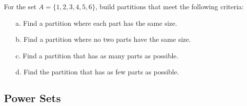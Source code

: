 \documentclass[a4paper,12pt]{book}
\newcounter{question}
\begin{document}
        \begin{questionNOGRADE}{\thequestion}

            For the set $A = \{1, 2, 3, 4, 5, 6\}$, build partitions that
            meet the following criteria:

            \begin{enumerate}
                \item[a.]   Find a partition where each part has the same size.

                \item[b.]   Find a partition where no two parts have the same size.

                \item[c.]   Find a partition that has as many parts as possible.

                \item[d.]   Find the partition that has as few parts as possible.
            \end{enumerate}

        \end{questionNOGRADE}

        \notonkey{ \newpage }{ \hrulefill }

    \subsection{Power Sets}
\end{document}

